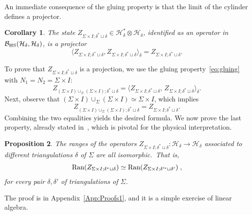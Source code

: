 \documentclass[11pt]{article}
\newcommand{\h}{\mathcal{H}}
\newtheorem{proposition}{Proposition}[section]
\newtheorem{corollary}[proposition]{Corollary}
\theoremstyle{definition}
\numberwithin{equation}{section}
\begin{document}
An immediate consequence of the gluing property is that the limit of the cylinder defines a projector.
\begin{corollary}\label{cor:w-proj}
    The state $Z_{\Sigma\times I;\delta^* \sqcup \delta}\in \h_\delta^*\otimes\h_\delta$, identified as an operator in $\mathcal{B}_{\rm HS}(\h_\delta,\h_\delta)$, is a projector
    \begin{equation}
    \label{eq:w-proj}
      \langle Z_{\Sigma\times I;\delta^* \sqcup \delta} , Z_{\Sigma\times I;\delta^* \sqcup \delta} \rangle_\delta = Z_{\Sigma\times I;\delta^* \sqcup \delta}.
    \end{equation}
\end{corollary}
\noindent
To prove that $Z_{\Sigma\times I;\delta^* \sqcup \delta}$ is a projection, 
we use the gluing property~\eqref{eq:gluing} with 
$N_1 = N_2 = \Sigma\times I$:
\begin{equation}
Z_{(\Sigma\times I)\cup_\Sigma(\Sigma\times I);\delta^* \sqcup \delta}
=
\big\langle 
Z_{\Sigma\times I;\delta^* \sqcup \delta},\,
Z_{\Sigma\times I;\delta^* \sqcup \delta}
\big\rangle_\delta.    
\end{equation}
Next, observe that $(\Sigma\times I)\cup_\Sigma (\Sigma\times I) \simeq \Sigma\times I$, which implies
\begin{equation}
  Z_{(\Sigma\times I)\cup_\Sigma(\Sigma\times I);\delta^* \sqcup \delta}
= 
Z_{\Sigma\times I;\delta^* \sqcup \delta}.  
\end{equation}
Combining the two equalities yields the desired formula. We now prove the last property, already stated in~\cite{Hellmann_2011}, which is pivotal for the physical interpretation.
\begin{proposition}
    \label{prop:w-range} The ranges of the operators $Z_{\Sigma\times I;\delta^* \sqcup \delta}:\mathcal{H}_{\delta}\to\mathcal{H}_{\delta}$ associated to different triangulations $\delta$ of $\Sigma$ are all isomorphic.~That is,  
   \begin{equation}
   {\rm Ran}(Z_{\Sigma\times I;\delta^* \sqcup \delta})\simeq {\rm Ran}(Z_{\Sigma\times I;\delta'^* \sqcup \delta'})\;,
   \end{equation}
   for every pair $\delta,\delta'$ of triangulations of $\Sigma$.
\end{proposition}
The proof is in Appendix~\ref{App:Proofs1}, and it is a simple exercise of linear algebra.

\smallskip
\end{document}
